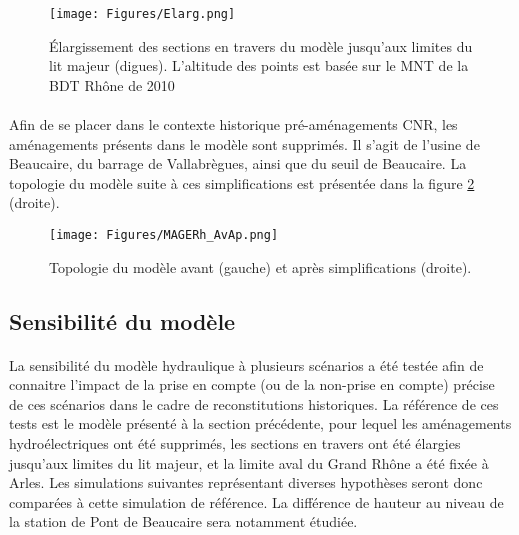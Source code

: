 \documentclass[11pt]{article}
\begin{document}
	\begin{figure}[h]
	\centering
		\texttt{[image: Figures/Elarg.png]}
        \caption{Élargissement des sections en travers du modèle jusqu'aux limites du lit majeur (digues). L'altitude des points est basée sur le MNT de la BDT Rhône de 2010 }
		\label{fig:Elarg}
	\end{figure}		
	
	\paragraph{} Afin de se placer dans le contexte historique pré-aménagements CNR, les aménagements présents dans le modèle sont supprimés. Il s'agit de l'usine de Beaucaire, du barrage de Vallabrègues, ainsi que du seuil de Beaucaire. La topologie du modèle suite à ces simplifications est présentée dans la figure \ref{fig:Mageavap} (droite).
	
	\begin{figure}[h]
	\centering
		\texttt{[image: Figures/MAGERh\_AvAp.png]}
        \caption{Topologie du modèle avant (gauche) et après simplifications (droite).}
		\label{fig:Mageavap}
	\end{figure}		
			
	\subsection{Sensibilité du modèle}
		
	\paragraph{} La sensibilité du modèle hydraulique à plusieurs scénarios a été testée afin de connaitre l'impact de la prise en compte (ou de la non-prise en compte) précise de ces scénarios dans le cadre de reconstitutions historiques. La référence de ces tests est le modèle présenté à la section précédente, pour lequel les aménagements hydroélectriques ont été supprimés, les sections en travers ont été élargies jusqu'aux limites du lit majeur, et la limite aval du Grand Rhône a été fixée à Arles. Les simulations suivantes représentant diverses hypothèses seront donc comparées à cette simulation de référence. La différence de hauteur au niveau de la station de Pont de Beaucaire sera notamment étudiée.
	
\end{document}
